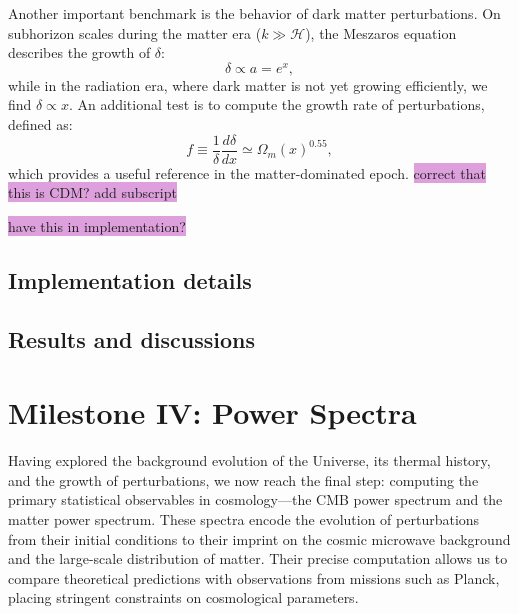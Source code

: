 \documentclass{aa}
\numberwithin{equation}{section}
\numberwithin{table}{section}
\numberwithin{figure}{section}
\begin{document}
Another important benchmark is the behavior of dark matter perturbations. On subhorizon scales during the matter era ($k \gg \mathcal{H}$), the Meszaros equation describes the growth of $\delta$:
\begin{equation}
\delta \propto a = e^x,
\end{equation}
while in the radiation era, where dark matter is not yet growing efficiently, we find $\delta \propto x$. An additional test is to compute the growth rate of perturbations, defined as:
\begin{equation}
f \equiv \frac{1}{\delta} \frac{d\delta}{dx} \simeq \Omega_m(x)^{0.55},
\end{equation}
which provides a useful reference in the matter-dominated epoch. \colorbox{Plum}{correct that this is CDM? add subscript}

\colorbox{Plum}{have this in implementation?}



\subsection{Implementation details}\label{subsec: III methods}

\subsection{Results and discussions}\label{subsec: III results}







\section{Milestone IV: Power Spectra}\label{sec: milestone IV}
Having explored the background evolution of the Universe, its thermal history, and the growth of perturbations, we now reach the final step: computing the primary statistical observables in cosmology—the CMB power spectrum and the matter power spectrum. These spectra encode the evolution of perturbations from their initial conditions to their imprint on the cosmic microwave background and the large-scale distribution of matter. Their precise computation allows us to compare theoretical predictions with observations from missions such as Planck, placing stringent constraints on cosmological parameters.  
\end{document}
